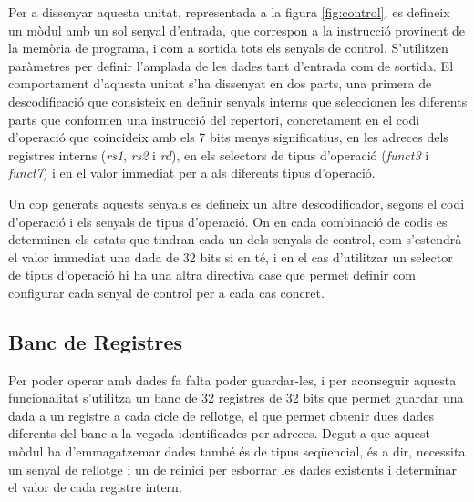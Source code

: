 \documentclass[10pt,a4paper,twocolumn,twoside]{article}
\begin{document}
    
    Per a dissenyar aquesta unitat, representada a la figura \ref{fig:control}, es defineix un mòdul amb un sol senyal d'entrada, que correspon a la instrucció provinent de la memòria de programa, i com a sortida tots els senyals de control. S'utilitzen paràmetres per definir l'amplada de les dades tant d'entrada com de sortida.
    El comportament d'aquesta unitat s'ha dissenyat en dos parts, una primera de descodificació que consisteix en definir senyals interns que seleccionen les diferents parts que conformen una instrucció del repertori, concretament en el codi d'operació que coincideix amb els 7 bits menys significatius, en les adreces dels registres interns (\textit{rs1}, \textit{rs2} i \textit{rd}), en els selectors de tipus d'operació (\textit{funct3} i \textit{funct7}) i en el valor immediat per a als diferents tipus d'operació.
    
    Un cop generats aquests senyals es defineix un altre descodificador, segons el codi d'operació i els senyals de tipus d'operació. On en cada combinació de codis es determinen els estats que tindran cada un dels senyals de control, com s'estendrà el valor immediat una dada de 32 bits si en té, i en el cas d'utilitzar un selector de tipus d'operació hi ha una altra directiva case que permet definir com configurar cada senyal de control per a cada cas concret.
    
    
    
    
    
    \subsection{Banc de Registres}
    Per poder operar amb dades fa falta poder guardar-les, i per aconseguir aquesta funcionalitat s'utilitza un banc de 32 registres de 32 bits que permet guardar una dada a un registre a cada cicle de rellotge, el que permet obtenir dues dades diferents del banc a la vegada identificades per adreces.
    Degut a que aquest mòdul ha d'emmagatzemar dades també és de tipus seqüencial, és a dir, necessita un senyal de rellotge i un de reinici per esborrar les dades existents i determinar el valor de cada registre intern.
    
\end{document}
